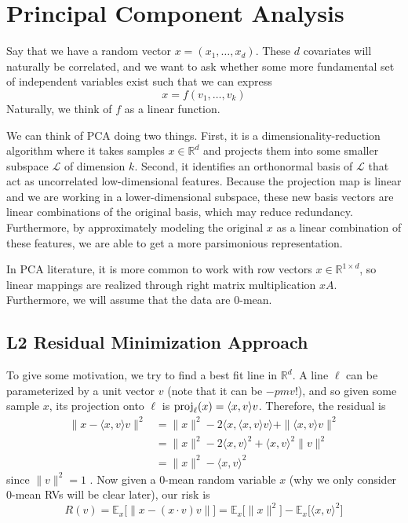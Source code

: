 \section{Principal Component Analysis}  

  Say that we have a random vector $x = (x_1, \ldots, x_d)$. These $d$ covariates will naturally be correlated, and we want to ask whether some more fundamental set of independent variables exist \cite{1933hotelling} such that we can express
  \begin{equation}
    x = f(v_1, \ldots, v_k)
  \end{equation} 
  Naturally, we think of $f$ as a linear function. 

  We can think of PCA doing two things. First, it is a dimensionality-reduction algorithm where it takes samples $x \in \mathbb{R}^d$ and projects them into some smaller subspace $\mathcal{L}$ of dimension $k$. Second, it identifies an orthonormal basis of $\mathcal{L}$ that act as uncorrelated low-dimensional features. Because the projection map is linear and we are working in a lower-dimensional subspace, these new basis vectors are linear combinations of the original basis, which may reduce redundancy. Furthermore, by approximately modeling the original $x$ as a linear combination of these features, we are able to get a more parsimonious representation. 

  In PCA literature, it is more common to work with row vectors $x \in \mathbb{R}^{1 \times d}$, so linear mappings are realized through right matrix multiplication $x A$. Furthermore, we will assume that the data are $0$-mean. 

\subsection{L2 Residual Minimization Approach} 

  To give some motivation, we try to find a best fit line in $\mathbb{R}^d$. A line $\ell$ can be parameterized by a unit vector $v$ (note that it can be $-pm v$!), and so given some sample $x$, its projection onto $\ell$ is $\operatorname{proj}_{\ell} (x) = \langle x, v\rangle v$. Therefore, the residual is 
  \begin{align}
    \| x - \langle x, v \rangle v \|^2 & = \|x\|^2 - 2 \langle x, \langle x, v \rangle v \rangle + \| \langle x, v \rangle v \|^2 \\ 
                                       & = \|x\|^2 - 2 \langle x, v \rangle^2 + \langle x, v \rangle^2 \|v\|^2 \\ 
                                       & = \|x\|^2 - \langle x, v \rangle^2
  \end{align}
  since $\|v\|^2 = 1$ \cite{2019shalizi}. Now given a $0$-mean random variable $x$ (why we only consider $0$-mean RVs will be clear later), our risk is
  \begin{equation}
    R(v) = \mathbb{E}_x \big[ \| x - (x \cdot v) v \| \big] = \mathbb{E}_x \big[ \|x\|^2 \big] - \mathbb{E}_x \big[ \langle x, v \rangle^2 \big]
  \end{equation} 

